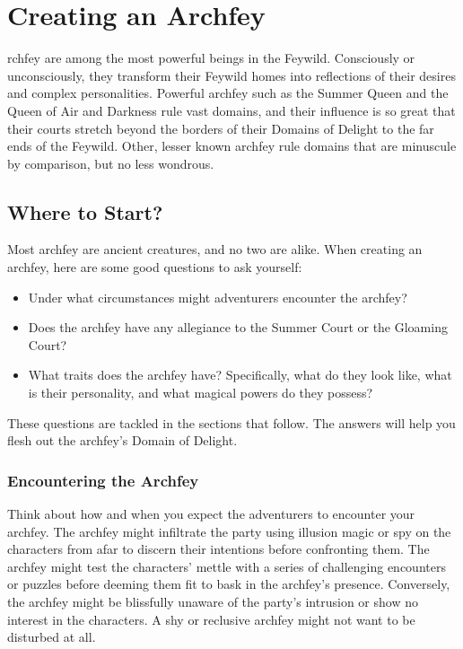 \documentclass[10pt,a4paper,twoside,bg=print,twocolumn,openany,nodeprecatedcode]{dndbook}
\begin{document}
\chapter{Creating an Archfey}
rchfey are among the most powerful beings in the Feywild. Consciously or unconsciously, they transform their Feywild homes into reflections of their desires and complex personalities. Powerful archfey such as the Summer Queen and the Queen of Air and Darkness rule vast domains, and their influence is so great that their courts stretch beyond the borders of their Domains of Delight to the far ends of the Feywild. Other, lesser known archfey rule domains that are minuscule by comparison, but no less wondrous.


\section{Where to Start?}
Most archfey are ancient creatures, and no two are alike. When creating an archfey, here are some good questions to ask yourself:


\begin{itemize}
\item Under what circumstances might adventurers encounter the archfey?
\item Does the archfey have any allegiance to the Summer Court or the Gloaming Court?
\item What traits does the archfey have? Specifically, what do they look like, what is their personality, and what magical powers do they possess?
\end{itemize}

These questions are tackled in the sections that follow. The answers will help you flesh out the archfey's Domain of Delight.

\subsection{Encountering the Archfey}
Think about how and when you expect the adventurers to encounter your archfey. The archfey might infiltrate the party using illusion magic or spy on the characters from afar to discern their intentions before confronting them. The archfey might test the characters' mettle with a series of challenging encounters or puzzles before deeming them fit to bask in the archfey's presence. Conversely, the archfey might be blissfully unaware of the party's intrusion or show no interest in the characters. A shy or reclusive archfey might not want to be disturbed at all.
\end{document}
